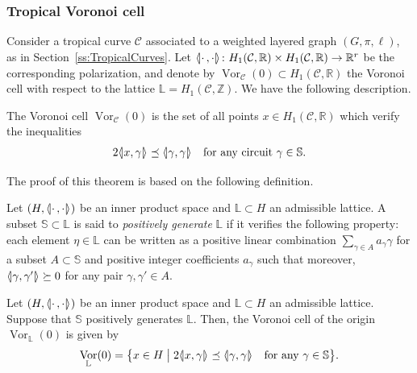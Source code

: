 \documentclass[AHL,Unicode,longabstracts]{cedram}
\newcommand{\llangle}{\mathopen{\langle\mkern -3.1mu\lvert}}
\newcommand{\rrangle}{\mathclose{\rvert\mkern -3.1mu\rangle}}
\newcommand{\highinn}[2]{{\llangle#2\rrangle_{#1}}}
\DeclareMathOperator{\Vor}{Vor}
\newcommand{\R}{\mathbb{R}}
\newcommand{\Z}{\mathbb{Z}}
\renewcommand{\L}{\mathbb{L}}
\renewcommand{\S}{\mathbb{S}}
\newcommand{\curve}{\mathcal{C}}
\renewcommand*{\to}{\mathchoice{\longrightarrow}{\rightarrow}{\rightarrow}{\rightarrow}}
\begin{document}
\subsubsection{Tropical Voronoi cell} \label{ss:TropicalVoronoiCell}

Consider a tropical curve $\curve$ associated to a weighted layered graph $(G, \pi, \ell)$, as in Section~\ref{ss:TropicalCurves}. Let $\highinn{}{\cdot\,,\cdot}\colon H_1(\curve, \R) \times H_1(\curve, \R) \to \R^r$ be the corresponding polarization, and denote by $\Vor_{\curve}(0) \subset H_1(\curve, \R)$ the Voronoi cell with respect to the lattice $\L = H_1(\curve, \Z)$. We have the following description.

\begin{theo}\label{thm:voronoi_tropical_curve}
The Voronoi cell $\Vor_\curve(0)$ is the set of all points $x \in H_1(\curve, \R)$ which verify the inequalities
\begin{align*}
2 \highinn{}{x, \gamma} \preceq \highinn{}{\gamma, \gamma} \quad \text{for any circuit } \gamma \in \S.
\end{align*}
\end{theo}

The proof of this theorem is based on the following definition.

\begin{defi} \label{defi:positive-generating}
Let $(H, \highinn{}{\cdot\,,\cdot})$ be an inner product space and $\L\subset H$ an admissible lattice. A subset $\S \subset \L$ is said to \emph{positively generate} $\L$ if it verifies the following property: each element $\eta \in \L$ can be written as a positive linear combination $\sum_{\gamma\in A} a_\gamma \gamma$ for a subset $A \subset \S$ and positive integer coefficients $a_\gamma$ such that moreover, $\highinn{}{\gamma,\gamma'} \succeq 0$ for any pair $\gamma, \gamma' \in A$.%
\end{defi}


\begin{lemm}\label{lem:voronoi_positive_generating_set}
Let $(H, \highinn{}{\cdot\,,\cdot})$ be an inner product space and $\L\subset H$ an admissible lattice. Suppose that $\S$ positively generates $\L$. Then, the Voronoi cell of the origin $\Vor_\L(0)$ is given by
\[
\Vor_\L(0) = \bigl\{x \in H \bigm| 2\highinn{}{x,\gamma} \preceq \highinn{}{\gamma,\gamma } \quad\text{for any $\gamma \in \S$}\bigr\}.
\]
\end{lemm}
\end{document}
